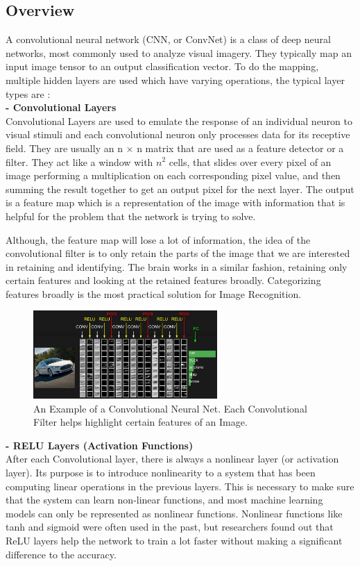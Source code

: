 \documentclass{ieee}
\begin{document}
\subsection{Overview}
A convolutional neural network (CNN, or ConvNet) is a class of deep neural networks, most commonly used to analyze visual imagery. They typically map an input image tensor to an output classification vector. To do the mapping, multiple hidden layers are used which have varying operations, the typical layer types are :\\
\textbf{- Convolutional Layers} \\
Convolutional Layers are used to emulate the response of an individual neuron to visual stimuli and each convolutional neuron only processes data for its receptive field. They are usually an n $\times$ n matrix that are used as a feature detector or a filter. They act like a window with $n^2$ cells, that slides over every pixel of an image  performing a multiplication on each corresponding pixel value, and then summing the result together to get an output pixel for the next layer. The output is a feature map which is a representation of the image with information that is helpful for the problem that the network is trying to solve.

Although, the feature map will lose a lot of information, the idea of the convolutional filter is to only retain the parts of the image that we are interested in retaining and identifying.
 The brain works in a similar fashion, retaining only certain features and looking at the retained features broadly. Categorizing features broadly is the most practical solution for Image Recognition.
 \begin{figure}[h]
    \begin{center}
    \includegraphics[width=7cm]{images/convnet.jpeg}
    \end{center}
    \label{mbconv_fig}
    \caption{An Example of a Convolutional Neural Net. Each Convolutional Filter helps highlight certain features of an Image. \cite{CONVNETIMAGE}}
\end{figure}

\textbf{- RELU Layers (Activation Functions) }\\
 After each Convolutional layer, there is always a nonlinear layer (or activation layer). Its purpose is to introduce nonlinearity to a system that has been computing linear operations in the previous layers. This is necessary to make sure that the system can learn non-linear functions, and most machine learning models can only be represented as nonlinear functions. Nonlinear functions like tanh and sigmoid were often used in the past, but researchers found out that ReLU layers help the network to train a lot faster without making a significant difference to the accuracy.
 
\end{document}

